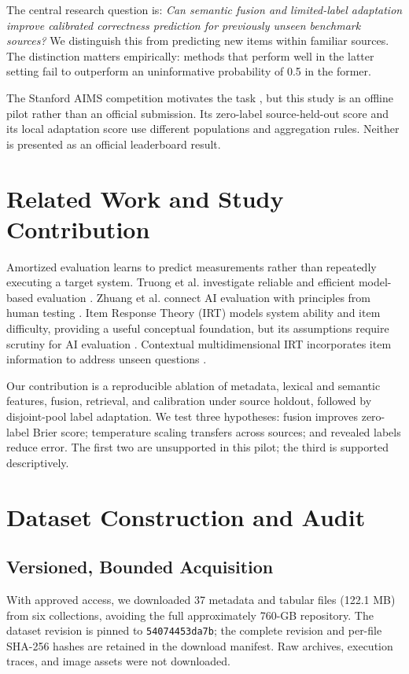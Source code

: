 \documentclass[conference]{IEEEtran}
\begin{document}
The central research question is: \textit{Can semantic fusion and limited-label adaptation improve calibrated correctness prediction for previously unseen benchmark sources?} We distinguish this from predicting new items within familiar sources. The distinction matters empirically: methods that perform well in the latter setting fail to outperform an uninformative probability of 0.5 in the former. 

The Stanford AIMS competition motivates the task \cite{aims}, but this study is an offline pilot rather than an official submission. Its zero-label source-held-out score and its local adaptation score use different populations and aggregation rules. Neither is presented as an official leaderboard result.

\section{Related Work and Study Contribution}
Amortized evaluation learns to predict measurements rather than repeatedly executing a target system. Truong et al. investigate reliable and efficient model-based evaluation \cite{truong2025}. Zhuang et al. connect AI evaluation with principles from human testing \cite{zhuang2023}. Item Response Theory (IRT) models system ability and item difficulty, providing a useful conceptual foundation, but its assumptions require scrutiny for AI evaluation \cite{jiang2026}. Contextual multidimensional IRT incorporates item information to address unseen questions \cite{shang2026}.

Our contribution is a reproducible ablation of metadata, lexical and semantic features, fusion, retrieval, and calibration under source holdout, followed by disjoint-pool label adaptation. We test three hypotheses: fusion improves zero-label Brier score; temperature scaling transfers across sources; and revealed labels reduce error. The first two are unsupported in this pilot; the third is supported descriptively.

\section{Dataset Construction and Audit}
\subsection{Versioned, Bounded Acquisition}
With approved access, we downloaded 37 metadata and tabular files (122.1 MB) from six collections, avoiding the full approximately 760-GB repository. The dataset revision is pinned to \texttt{54074453da7b}; the complete revision and per-file SHA-256 hashes are retained in the download manifest. Raw archives, execution traces, and image assets were not downloaded.
\end{document}
